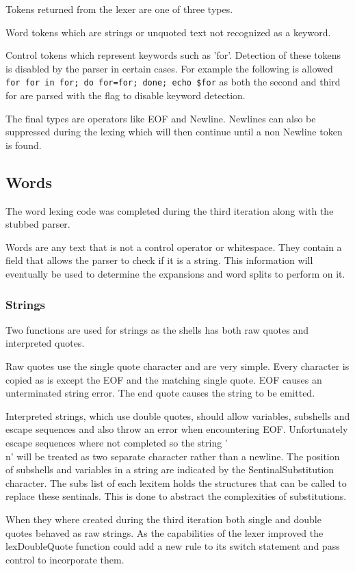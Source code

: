Tokens returned from the lexer are one of three types.

Word tokens which are strings or unquoted text not recognized as a keyword.

Control tokens which represent keywords such as 'for'.
Detection of these tokens is disabled by the parser in certain cases.
For example the following is allowed \verb!for for in for; do for=for; done; echo $for! as both the second and third for are parsed with the flag to disable keyword detection.

The final types are operators like EOF and Newline. 
Newlines can also be suppressed during the lexing which will then continue until a non Newline token is found. 

\subsection{Words}
The word lexing code was completed during the third iteration along with the stubbed parser.

Words are any text that is not a control operator or whitespace.
They contain a field that allows the parser to check if it is a string.
This information will eventually be used to determine the expansions and word splits to perform on it.

\subsubsection{Strings}
Two functions are used for strings as the shells has both raw quotes and interpreted quotes.

Raw quotes use the single quote character and are very simple.
Every character is copied as is except the EOF and the matching single quote.
EOF causes an unterminated string error.
The end quote causes the string to be emitted.

Interpreted strings, which use double quotes, should allow variables, subshells and escape sequences and also throw an error when encountering EOF.
Unfortunately escape sequences where not completed so the string '\\n' will be treated as two separate character rather than a newline.
The position of subshells and variables in a string are indicated by the SentinalSubstitution character.
The subs list of each lexitem holds the structures that can be called to replace these sentinals.
This is done to abstract the complexities of substitutions.

When they where created during the third iteration both single and double quotes behaved as raw strings.
As the capabilities of the lexer improved the lexDoubleQuote function could add a new rule to its switch statement and pass control to incorporate them.

